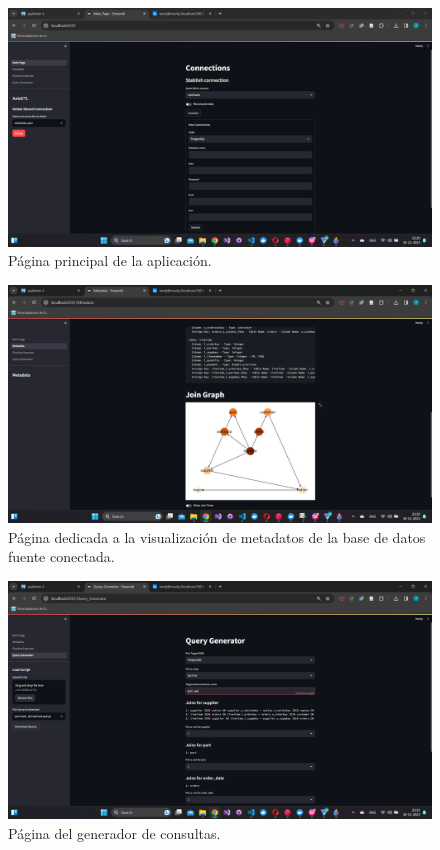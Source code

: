 \begin{annexes}
    \begin{figure}
        \centering
        \includegraphics[scale=0.4]{Graphics/mainpage.png}
        \caption{P\'agina principal de la aplicaci\'on.}
        \label{fig:mainpage}
      \end{figure}

    \begin{figure}
        \centering
        \includegraphics[scale=0.4]{Graphics/metadata.png}
        \caption{P\'agina dedicada a la visualizaci\'on de metadatos de la base de datos fuente conectada.}
        \label{fig:meta}
    \end{figure}

    \begin{figure}
        \centering
        \includegraphics[scale=0.4]{Graphics/querygene.png}
        \caption{P\'agina del generador de consultas.}
        \label{fig:generator}
    \end{figure}


\end{annexes}

